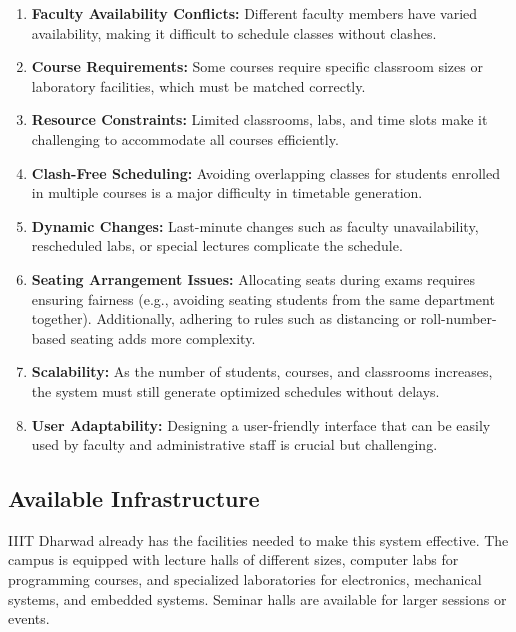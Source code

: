 \documentclass[12pt]{article}
\begin{document}
\begin{enumerate}
    \item \textbf{Faculty Availability Conflicts:} Different faculty members have varied availability, making it difficult to schedule classes without clashes.
    
    \item \textbf{Course Requirements:} Some courses require specific classroom sizes or laboratory facilities, which must be matched correctly.
    
    \item \textbf{Resource Constraints:} Limited classrooms, labs, and time slots make it challenging to accommodate all courses efficiently.
    
    \item \textbf{Clash-Free Scheduling:} Avoiding overlapping classes for students enrolled in multiple courses is a major difficulty in timetable generation.
    
    \item \textbf{Dynamic Changes:} Last-minute changes such as faculty unavailability, rescheduled labs, or special lectures complicate the schedule.
    
    \item \textbf{Seating Arrangement Issues:} Allocating seats during exams requires ensuring fairness (e.g., avoiding seating students from the same department together). Additionally, adhering to rules such as distancing or roll-number-based seating adds more complexity.
    
    \item \textbf{Scalability:} As the number of students, courses, and classrooms increases, the system must still generate optimized schedules without delays.
    
    \item \textbf{User Adaptability:} Designing a user-friendly interface that can be easily used by faculty and administrative staff is crucial but challenging.
\end{enumerate}

\subsection{Available Infrastructure}

IIIT Dharwad already has the facilities needed to make this system effective. The campus is equipped with lecture halls of different sizes, computer labs for programming courses, and specialized laboratories for electronics, mechanical systems, and embedded systems. Seminar halls are available for larger sessions or events.
\end{document}

